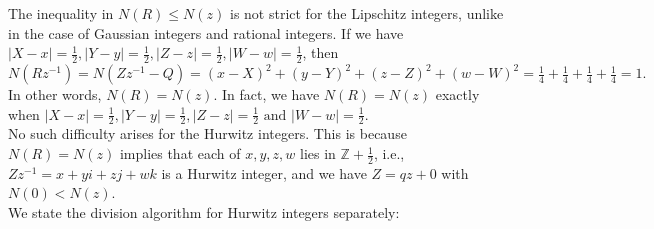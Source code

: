 \documentclass[11pt]{report}
\theoremstyle{plain}
\theoremstyle{definition}
\begin{document}
The inequality in $ N(R)\leq N(z) $ is not strict for the Lipschitz integers, unlike in the case of Gaussian integers and rational integers. If we have $ |X-x|=\frac{1}{2}, |Y-y|=\frac{1}{2}, |Z-z|=\frac{1}{2}, |W-w|=\frac{1}{2} $, then $ N(Rz^{-1}) = N(Zz^{-1}-Q) = (x-X)^2+(y-Y)^2+(z-Z)^2+(w-W)^2 = \frac{1}{4} + \frac{1}{4} + \frac{1}{4}+ \frac{1}{4}= 1.$ In other words, $ N(R)=N(z). $ In fact, we have $ N(R)=N(z) $ exactly when $ |X-x|=\frac{1}{2}, |Y-y|=\frac{1}{2}, |Z-z|=\frac{1}{2} \text{ and }|W-w|=\frac{1}{2} $.\\
	No such difficulty arises for the Hurwitz integers. This is because  $ N(R)=N(z) $ implies that each of $ x ,y ,z, w $ lies in $ \mathbb{Z}+\frac{1}{2} $, i.e., $ Zz^{-1} = x + yi +zj+wk $ is a Hurwitz integer, and we have $ Z = qz + 0 $ with $ N(0)<N(z). $\\ We state the division algorithm for Hurwitz integers separately:
	
\end{document}
